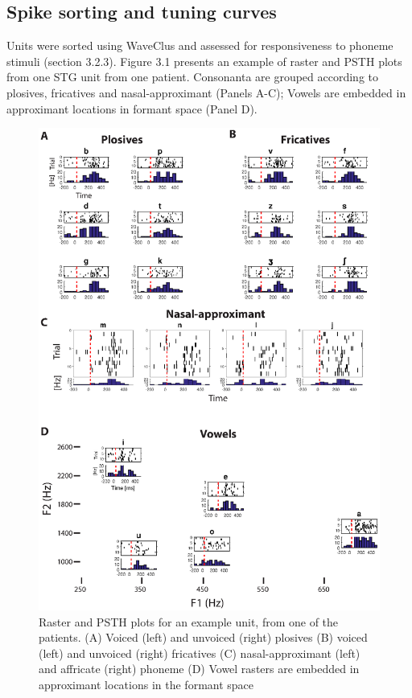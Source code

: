 \subsection{Spike sorting and tuning curves}
Units were sorted using WaveClus and assessed for responsiveness to phoneme stimuli (section 3.2.3). Figure 3.1 presents an example of raster and PSTH plots from one STG unit from one patient. Consonanta are grouped according to plosives, fricatives and nasal-approximant (Panels A-C); Vowels are embedded in approximant locations in formant space (Panel D).

\begin{figure}[H]
\vspace{.3in}
\includegraphics[width=\linewidth]{Figures/Ch3/Figure2_new.eps}
\caption{Raster and PSTH plots for an example unit, from one of the patients. (A) Voiced (left) and unvoiced (right) plosives (B) voiced (left) and unvoiced (right) fricatives (C)  nasal-approximant (left) and affricate (right) phoneme (D) Vowel rasters are embedded in approximant locations in the formant space}
\end{figure}

